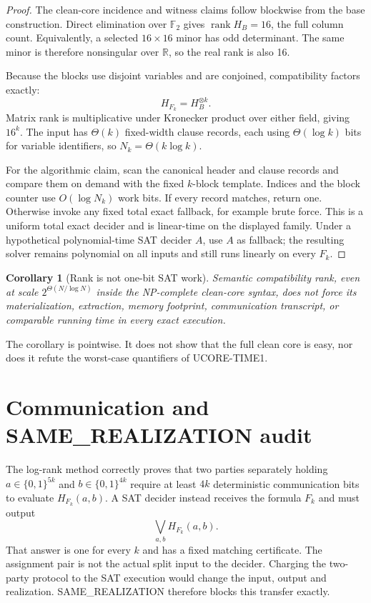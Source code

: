 \documentclass[11pt]{article}
\newtheorem{corollary}[theorem]{Corollary}
\begin{document}
\begin{proof}
The clean-core incidence and witness claims follow blockwise from the base
construction.  Direct elimination over $\mathbb F_2$ gives
\(
\operatorname{rank}H_B=16
\), the full column count.  Equivalently, a selected $16\times16$ minor has
odd determinant.  The same minor is therefore nonsingular over $\mathbb R$,
so the real rank is also 16.

Because the blocks use disjoint variables and are conjoined, compatibility
factors exactly:
\[
 H_{F_k}=H_B^{\otimes k}.
\]
Matrix rank is multiplicative under Kronecker product over either field,
giving $16^k$.  The input has $\Theta(k)$ fixed-width clause records, each
using $\Theta(\log k)$ bits for variable identifiers, so
$N_k=\Theta(k\log k)$.

For the algorithmic claim, scan the canonical header and clause records and
compare them on demand with the fixed $k$-block template.  Indices and the
block counter use $O(\log N_k)$ work bits.  If every record matches, return
one.  Otherwise invoke any fixed total exact fallback, for example brute
force.  This is a uniform total exact decider and is linear-time on the
displayed family.  Under a hypothetical polynomial-time SAT decider $A$, use
$A$ as fallback; the resulting solver remains polynomial on all inputs and
still runs linearly on every $F_k$.
\end{proof}

\begin{corollary}[Rank is not one-bit SAT work]
Semantic compatibility rank, even at scale
$2^{\Theta(N/\log N)}$ inside the NP-complete clean-core syntax, does not
force its materialization, extraction, memory footprint, communication
transcript, or comparable running time in every exact execution.
\end{corollary}

The corollary is pointwise.  It does not show that the full clean core is
easy, nor does it refute the worst-case quantifiers of UCORE-TIME1.

\section{Communication and SAME\_REALIZATION audit}

The log-rank method correctly proves that two parties separately holding
$a\in\{0,1\}^{5k}$ and $b\in\{0,1\}^{4k}$ require at least $4k$ deterministic
communication bits to evaluate $H_{F_k}(a,b)$.  A SAT decider instead receives
the formula $F_k$ and must output
\[
 \bigvee_{a,b}H_{F_k}(a,b).
\]
That answer is one for every $k$ and has a fixed matching certificate.  The
assignment pair is not the actual split input to the decider.  Charging the
two-party protocol to the SAT execution would change the input, output and
realization.  SAME\_REALIZATION therefore blocks this transfer exactly.
\end{document}
